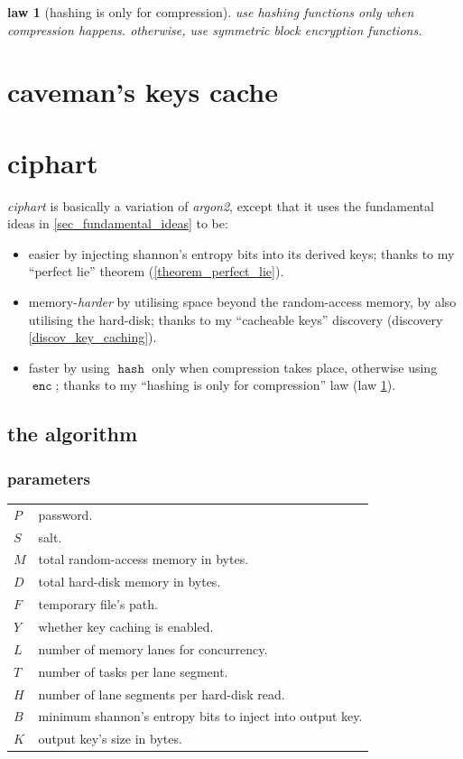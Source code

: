 \documentclass[twocolumn]{article}
\newtheorem{law}{law}[section]
\DeclareMathOperator{\enc}{\mathtt{enc}}
\DeclareMathOperator{\hash}{\mathtt{hash}}
\begin{document}
\begin{law}[hashing is only for compression]\label{law_simplification}
    use hashing functions only when compression happens.  otherwise, use
    symmetric block encryption functions.
\end{law}


\section{caveman's keys cache}

\section{ciphart}
\emph{ciphart} is basically a variation of \emph{argon2}, except that it
uses the fundamental ideas in \cref{sec_fundamental_ideas} to be:
\begin{itemize}
    \item easier by injecting shannon's entropy bits into its derived keys;
    thanks to my ``perfect lie'' theorem (\cref{theorem_perfect_lie}).

    \item memory-\emph{harder} by utilising space beyond the random-access
    memory, by also utilising the hard-disk; thanks to my ``cacheable
    keys'' discovery (discovery \ref{discov_key_caching}).

    \item faster by using $\hash$ only when compression takes place,
    otherwise using $\enc$; thanks to my ``hashing is only for
    compression'' law (law \ref{law_simplification}).
\end{itemize}

\subsection{the algorithm}
\subsubsection{parameters}
\begin{tabularx}{\columnwidth}{lX}
    $P$ & password.\\
    $S$ & salt.\\
    $M$ & total random-access memory in bytes.\\
    $D$ & total hard-disk memory in bytes.\\
    $F$ & temporary file's path.\\
    $Y$ & whether key caching is enabled.\\
    $L$ & number of memory lanes for concurrency.\\
    $T$ & number of tasks per lane segment.\\
    $H$ & number of lane segments per hard-disk read.\\
    $B$ & minimum shannon's entropy bits to inject into output key.\\
    $K$ & output key's size in bytes.\\
\end{tabularx}
\end{document}
